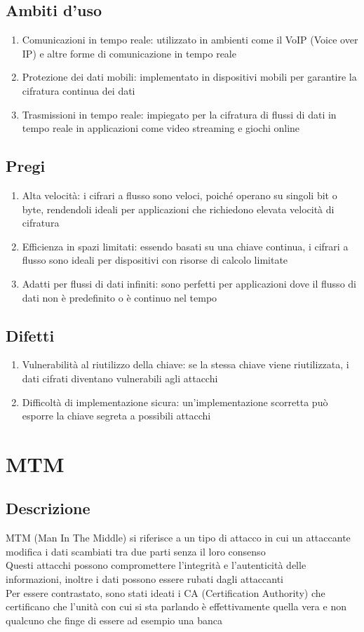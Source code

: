 \documentclass[10pt,oneside,a4paper]{article}
\begin{document}
\begin{enumerate}
\subsection{Ambiti d'uso}
\begin{enumerate}
\item Comunicazioni in tempo reale: utilizzato in ambienti come il VoIP (Voice over IP) e altre forme di comunicazione in tempo reale
\item Protezione dei dati mobili: implementato in dispositivi mobili per garantire la cifratura continua dei dati
\item Trasmissioni in tempo reale: impiegato per la cifratura di flussi di dati in tempo reale in applicazioni come video streaming e giochi online
\end{enumerate}
\subsection{Pregi}
\begin{enumerate}
\item Alta velocità: i cifrari a flusso sono veloci, poiché operano su singoli bit o byte, rendendoli ideali per applicazioni che richiedono elevata velocità di cifratura
\item Efficienza in spazi limitati: essendo basati su una chiave continua, i cifrari a flusso sono ideali per dispositivi con risorse di calcolo limitate
\item Adatti per flussi di dati infiniti: sono perfetti per applicazioni dove il flusso di dati non è predefinito o è continuo nel tempo
\end{enumerate}
\subsection{Difetti}
\begin{enumerate}
\item Vulnerabilità al riutilizzo della chiave: se la stessa chiave viene riutilizzata, i dati cifrati diventano vulnerabili agli attacchi
\item Difficoltà di implementazione sicura: un'implementazione scorretta può esporre la chiave segreta a possibili attacchi
\end{enumerate}
\section{MTM}
\subsection{Descrizione}
MTM (Man In The Middle) si riferisce a un tipo di attacco in cui un attaccante modifica i dati scambiati tra due parti senza il loro consenso\\
Questi attacchi possono compromettere l'integrità e l'autenticità delle informazioni, inoltre i dati possono essere rubati dagli attaccanti\\
Per essere contrastato, sono stati ideati i CA (Certification Authority) che certificano che l'unità con cui si sta parlando è effettivamente quella vera e non qualcuno che finge di essere ad esempio una banca

\end{enumerate}
\end{document}
